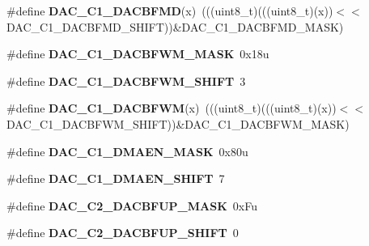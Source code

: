 \begin{DoxyCompactItemize}
\item 
\#define {\bfseries D\+A\+C\+\_\+\+C1\+\_\+\+D\+A\+C\+B\+F\+MD}(x)~(((uint8\+\_\+t)(((uint8\+\_\+t)(x))$<$$<$D\+A\+C\+\_\+\+C1\+\_\+\+D\+A\+C\+B\+F\+M\+D\+\_\+\+S\+H\+I\+FT))\&D\+A\+C\+\_\+\+C1\+\_\+\+D\+A\+C\+B\+F\+M\+D\+\_\+\+M\+A\+SK)\hypertarget{group__DAC__Register__Masks_gabfcb0420c4e52f927d23e6c28554d648}{}\label{group__DAC__Register__Masks_gabfcb0420c4e52f927d23e6c28554d648}

\item 
\#define {\bfseries D\+A\+C\+\_\+\+C1\+\_\+\+D\+A\+C\+B\+F\+W\+M\+\_\+\+M\+A\+SK}~0x18u\hypertarget{group__DAC__Register__Masks_gaad89dbfc60735cf12eb6cfff9157fffa}{}\label{group__DAC__Register__Masks_gaad89dbfc60735cf12eb6cfff9157fffa}

\item 
\#define {\bfseries D\+A\+C\+\_\+\+C1\+\_\+\+D\+A\+C\+B\+F\+W\+M\+\_\+\+S\+H\+I\+FT}~3\hypertarget{group__DAC__Register__Masks_gacc4542331c55b93fe589d439a69122f7}{}\label{group__DAC__Register__Masks_gacc4542331c55b93fe589d439a69122f7}

\item 
\#define {\bfseries D\+A\+C\+\_\+\+C1\+\_\+\+D\+A\+C\+B\+F\+WM}(x)~(((uint8\+\_\+t)(((uint8\+\_\+t)(x))$<$$<$D\+A\+C\+\_\+\+C1\+\_\+\+D\+A\+C\+B\+F\+W\+M\+\_\+\+S\+H\+I\+FT))\&D\+A\+C\+\_\+\+C1\+\_\+\+D\+A\+C\+B\+F\+W\+M\+\_\+\+M\+A\+SK)\hypertarget{group__DAC__Register__Masks_ga2084f4d4d9fd92156a8011e26ffb55a8}{}\label{group__DAC__Register__Masks_ga2084f4d4d9fd92156a8011e26ffb55a8}

\item 
\#define {\bfseries D\+A\+C\+\_\+\+C1\+\_\+\+D\+M\+A\+E\+N\+\_\+\+M\+A\+SK}~0x80u\hypertarget{group__DAC__Register__Masks_ga091be41dfd851b71978ab7298c372292}{}\label{group__DAC__Register__Masks_ga091be41dfd851b71978ab7298c372292}

\item 
\#define {\bfseries D\+A\+C\+\_\+\+C1\+\_\+\+D\+M\+A\+E\+N\+\_\+\+S\+H\+I\+FT}~7\hypertarget{group__DAC__Register__Masks_ga481f558223c5c36402bebe924bdd00a3}{}\label{group__DAC__Register__Masks_ga481f558223c5c36402bebe924bdd00a3}

\item 
\#define {\bfseries D\+A\+C\+\_\+\+C2\+\_\+\+D\+A\+C\+B\+F\+U\+P\+\_\+\+M\+A\+SK}~0x\+Fu\hypertarget{group__DAC__Register__Masks_ga329015367026aaee34f54edcbaab61bb}{}\label{group__DAC__Register__Masks_ga329015367026aaee34f54edcbaab61bb}

\item 
\#define {\bfseries D\+A\+C\+\_\+\+C2\+\_\+\+D\+A\+C\+B\+F\+U\+P\+\_\+\+S\+H\+I\+FT}~0\hypertarget{group__DAC__Register__Masks_ga5d43a79719748e490a572fa6cdc75efe}{}\label{group__DAC__Register__Masks_ga5d43a79719748e490a572fa6cdc75efe}


\end{DoxyCompactItemize}
